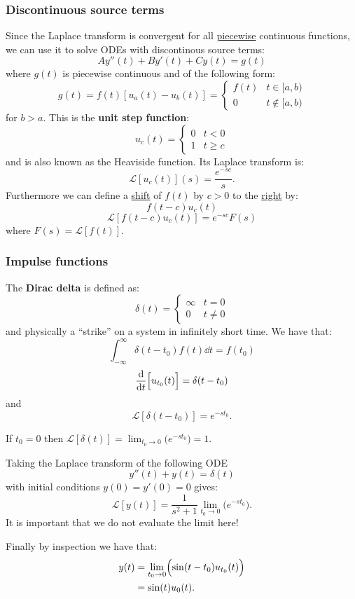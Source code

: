\documentclass{article}
\begin{document}
\begin{multicols}{3}
\subsubsection{Discontinuous source terms}
Since the Laplace transform is convergent for all \underline{piecewise}
continuous functions, we can use it to solve ODEs with 
discontinous source terms:
$$Ay''(t)+By'(t)+Cy(t)=g(t)$$
where $g(t)$ is piecewise continuous and of the following form:
$$g(t)=f(t)[u_a(t)-u_b(t)]
=\left\{
    \begin{array}{lr}
        f(t) & t\in[a,b) \\
        0 & t\notin[a,b)
    \end{array}
\right.$$
for $b>a$. This is the \textbf{unit step function}:
$$u_c(t)=\left\{
    \begin{array}{lr}
        0 & t<0 \\
        1 & t\geq c
    \end{array}
\right.$$
and is also known as the Heaviside function. Its Laplace transform is:
$$\mathcal{L}[u_c(t)](s)=\frac{e^{-sc}}{s}.$$
Furthermore we can define a \underline{shift} of $f(t)$ by $c>0$ to the 
\underline{right} by:
$$f(t-c)u_c(t)$$
$$\mathcal{L}[f(t-c)u_c(t)]=e^{-sc}F(s)$$
where $F(s)=\mathcal{L}[f(t)]$.

\subsubsection{Impulse functions}
The \textbf{Dirac delta} is defined as:
$$\delta(t)=\left\{
    \begin{array}{lr}
        \infty & t=0 \\
        0 & t\neq0
    \end{array}
\right.$$
and physically a ``strike'' on a system
in infinitely short time.
We have that:
$$\int_{-\infty}^{\infty}\delta(t-t_0)
f(t)\dd t=f(t_0)$$
$$\dv{t}\Bigl[u_{t_0}(t)\Bigr]
=\delta(t-t_0)$$
and
$$\mathcal{L}[\delta(t-t_0)]
=e^{-st_0}.$$

If $t_0=0$ then
$\displaystyle\mathcal{L}[\delta(t)]
=\lim_{t_0\rightarrow0}
\bigl(e^{-st_0}\bigr)=1$.

Taking the Laplace transform of the following ODE
$$y''(t)+y(t)=\delta(t)$$
with initial conditions $y(0)=y'(0)=0$ gives:
$$\mathcal{L}[y(t)]
=\frac{1}{s^2+1}
\lim_{t_0\rightarrow0}\bigl(
e^{-s t_0}
\bigr).$$
It is important that we do not evaluate the limit here!

Finally by inspection we have that:
\begin{align*}
    y(t)
    &=\lim_{t_0\rightarrow0}
    \Bigl(\sin(t-t_0)u_{t_0}(t)\Bigr) \\
    &=\sin(t)u_0(t).
\end{align*}


\end{multicols}
\end{document}

